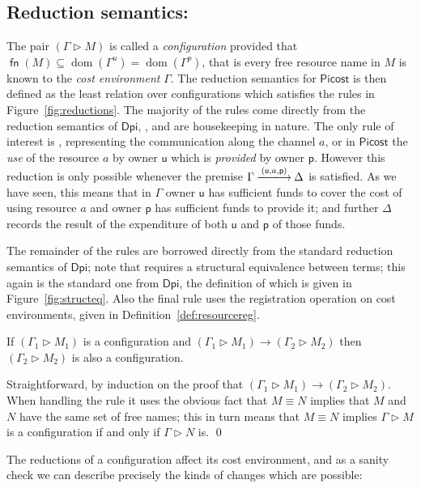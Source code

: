 \documentclass{LMCS}
\newcommand{\pfn}[1]{\mathsf{#1}}  \newcommand{\cfn}[1]{\mathsf{#1}}  \newcommand{\ownfnt}[1]{{\mathsf{#1}}}
\newcommand{\DPI}{\ensuremath{\pfn{Dpi}}\xspace}
\newcommand{\picost}{\ensuremath{\pfn{Picost}}\xspace}
\newcommand{\with}{\mathbin \rhd}
\newcommand{\cancom}[3]{({\ownfnt{#1}},{#2},{\ownfnt{#3}}) \xspace}
\newcommand{\dom}[1]{\mathop{\text{dom}}(#1)}
\newcommand{\ar}[1]{\mathbin{\xlongrightarrow{ #1}}}
\newcommand{\smalleval}{\longrightarrow}  \newcommand{\csmalleval}[1]{\longrightarrow^{#1}}
\newcommand{\structeq}{\equiv}
\newcommand{\fn}[1]{\mathop{\pfn{fn}}(#1)}
\begin{document}
\subsection{Reduction semantics:}
The pair $(\Gamma \with M)$ is called a \emph{configuration} provided that
$\fn{M} \subseteq \dom{\Gamma^u} = \dom{\Gamma^p}$, that is every free
resource name in $M$ is known to the \emph{cost environment} $\Gamma$.
The reduction semantics for \picost is then defined as the least
relation over configurations which satisfies the rules in
Figure~\ref{fig:reductions}.  The majority of the rules come directly
from the reduction semantics of \DPI, \cite{dpibook}, and are
housekeeping in nature. The only rule of interest is ,
representing the communication along the channel $a$, or in \picost
the \emph{use} of the resource $a$ by owner $\ownfnt u$ which is
\emph{provided} by owner $\ownfnt p$. However this reduction is only possible
whenever the premise $\Gamma \ar{\cancom{u}{a}{p}} \Delta$ is
satisfied.
As we have seen, this means that in $\Gamma$ owner $\ownfnt u$
has sufficient funds to cover the cost of using resource $a$ and owner
$\ownfnt p$ has sufficient funds to provide it; and further $\Delta$ records
the result of the expenditure of both $\ownfnt u$ and $\ownfnt p$ of
those funds.


The remainder of the rules are borrowed directly from the standard
reduction semantics of \DPI; note that  requires a
structural equivalence between terms; this again is the standard one
from \DPI, the definition of which is given  in
Figure~\ref{fig:structeq}. Also the final rule  uses the
registration operation on cost environments, given in
Definition~\ref{def:resourcereg}.
\begin{prop}
  If $(\Gamma_1 \with M_1)$ is a configuration and 
$(\Gamma_1 \with M_1) \smalleval (\Gamma_2 \with M_2)$ 
then $(\Gamma_2 \with M_2)$ is also a configuration.  
\end{prop}
\proof
Straightforward, by induction on the proof that 
$(\Gamma_1 \with M_1) \smalleval (\Gamma_2 \with M_2)$.
When handling the rule  it uses the obvious fact that $M \structeq N$
implies that $M$ and $N$ have the same set of free names; this in turn means that
$M \structeq N$ implies $\Gamma \with M$ is a configuration if and only if
$\Gamma \with N$ is. 
\qed

The reductions of a configuration affect its cost environment, and
as a sanity check we can describe precisely the kinds of changes which
are possible:\vfill\eject
\end{document}

